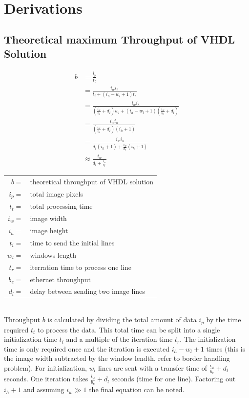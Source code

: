 \section{Derivations} \label{app:derivations}
\subsection{Theoretical maximum Throughput of VHDL Solution} \label{app:derivations:theomax}

\begin{align}
    b  & = \frac{i_p}{t_t} \\
       & = \frac{i_w i_h}{t_i+(i_h-w_l+1)t_r} \\
       & = \frac{i_w i_h}{(\frac{i_w}{b_e}+d_l)w_l+(i_h-w_l+1)(\frac{i_w}
       {b_e}+d_l)} \\
       & = \frac{i_w i_h}{(\frac{i_w}{b_e}+d_l)(i_h+1)} \\
       & = \frac{i_w i_h}{d_l(i_h+1)+\frac{i_w}{b_e}(i_h+1)} \\
       & \approx \frac{i_w}{d_l+\frac{i_w}{b_e}}
    \label{app:eq:theomaxb}
\end{align}
\begin{tabular}{rl}
    $b     =$ & theoretical throughput of VHDL solution \\
    $i_p   =$ & total image pixels \\
    $t_t   =$ & total processing time \\
    $i_w   =$ & image width \\
    $i_h   =$ & image height \\
    $t_i   =$ & time to send the initial lines \\
    $w_l   =$ & windows length \\
    $t_r   =$ & iterration time to process one line \\
    $b_e   =$ & ethernet throughput \\
    $d_l   =$ & delay between sending two image lines \\
\end{tabular} \\

Throughput $b$ is calculated by dividing the total amount of data $i_p$ by the
time required $t_t$ to process the data. This total time can be split into a
single initialization time $t_i$ and a multiple of the iteration time $t_r$. The
initialization time is only required once and the iteration is executed
$i_h-w_l+1$ times (this is the image width subtracted by the window lendth,
refer
to border handling problem). For initialization, $w_l$ lines are sent with a
transfer time of $\frac{i_w}{b_e} + d_l$ seconds. One iteration takes $
\frac{i_w}{b_e} + d_l$ seconds (time for one line). Factoring out $i_h+1$ and
assuming $i_w \gg 1$
the final equation can be noted.
\clearpage

